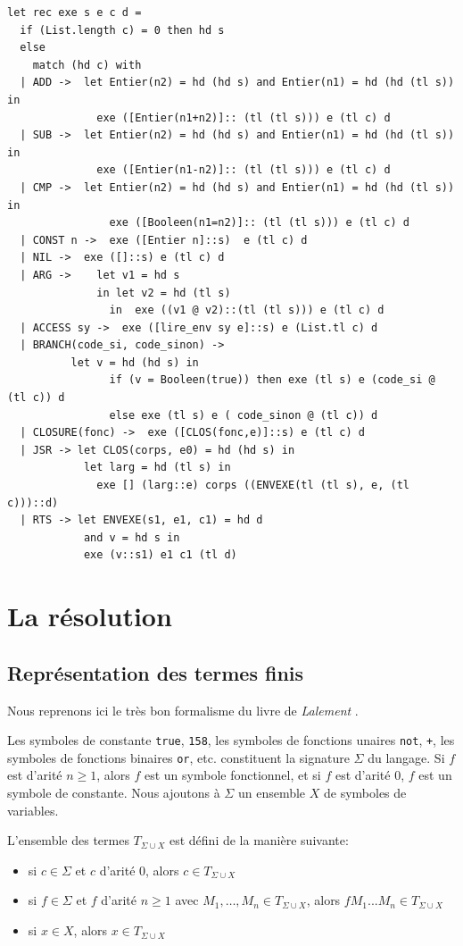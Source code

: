 \documentclass[11pt]{book}
\begin{document}
\begin{footnotesize}
\begin{Verbatim}
let rec exe s e c d =
  if (List.length c) = 0 then hd s
  else
    match (hd c) with
  | ADD ->  let Entier(n2) = hd (hd s) and Entier(n1) = hd (hd (tl s)) in
              exe ([Entier(n1+n2)]:: (tl (tl s))) e (tl c) d  
  | SUB ->  let Entier(n2) = hd (hd s) and Entier(n1) = hd (hd (tl s)) in
              exe ([Entier(n1-n2)]:: (tl (tl s))) e (tl c) d  
  | CMP ->  let Entier(n2) = hd (hd s) and Entier(n1) = hd (hd (tl s)) in 
                exe ([Booleen(n1=n2)]:: (tl (tl s))) e (tl c) d   
  | CONST n ->  exe ([Entier n]::s)  e (tl c) d
  | NIL ->  exe ([]::s) e (tl c) d 
  | ARG ->    let v1 = hd s
              in let v2 = hd (tl s)
                in  exe ((v1 @ v2)::(tl (tl s))) e (tl c) d
  | ACCESS sy ->  exe ([lire_env sy e]::s) e (List.tl c) d
  | BRANCH(code_si, code_sinon) ->
          let v = hd (hd s) in 
                if (v = Booleen(true)) then exe (tl s) e (code_si @ (tl c)) d 
                else exe (tl s) e ( code_sinon @ (tl c)) d 
  | CLOSURE(fonc) ->  exe ([CLOS(fonc,e)]::s) e (tl c) d
  | JSR -> let CLOS(corps, e0) = hd (hd s) in
            let larg = hd (tl s) in 
              exe [] (larg::e) corps ((ENVEXE(tl (tl s), e, (tl c)))::d) 
  | RTS -> let ENVEXE(s1, e1, c1) = hd d 
            and v = hd s in
            exe (v::s1) e1 c1 (tl d)
\end{Verbatim}
\end{footnotesize}

\chapter{La résolution}
\section{Représentation des termes finis}
Nous reprenons ici le très bon formalisme du livre de \textit{Lalement} \cite{lalement}.


Les symboles de constante \verb+true+, \verb+158+, les symboles de fonctions unaires \verb+not+, \verb-+-,
les symboles de fonctions binaires \verb+or+, etc. constituent la signature $\Sigma$ du langage.
Si $f$ est d'arité $n \geq 1$, alors $f$ est un symbole fonctionnel, et si $f$ est d'arité $0$, $f$ est un symbole de constante.
Nous ajoutons à $\Sigma$ un ensemble $X$ de symboles de variables.

L'ensemble des termes $T_{\Sigma \cup X}$ est défini de la manière suivante:
\begin{itemize}
	\item si $c \in \Sigma$ et $c$ d'arité $0$, alors $c \in T_{\Sigma \cup X}$ 
	\item si $f \in \Sigma$ et $f$ d'arité $n \geq  1$ avec $M_1, \dots, M_n \in T_{\Sigma \cup X}$, alors $f M_1 ... M_n \in T_{\Sigma \cup X}$
	\item si $x \in X$, alors $x \in T_{\Sigma \cup X}$
\end{itemize}
\end{document}
